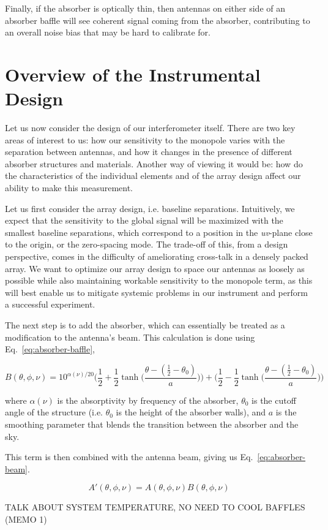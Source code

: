 Finally, if the absorber is optically thin, then antennas on either side of an 
absorber baffle will see coherent signal coming from the absorber, contributing 
to an overall noise bias that may be hard to calibrate for.

\section{Overview of the Instrumental Design}

Let us now consider the design of our interferometer itself. There are two key 
areas of interest to us: how our sensitivity to the monopole varies with the 
separation between antennas, and how it changes in the presence of different 
absorber structures and materials. Another way of viewing it would be: how do 
the characteristics of the individual elements and of the array design affect 
our ability to make this measurement.

Let us first consider the array design, i.e. baseline separations. Intuitively, 
we expect that the sensitivity to the global signal will be maximized with the 
smallest baseline separations, which correspond to a position in the 
\emph{uv}-plane close to the origin, or the zero-spacing mode.  The trade-off 
of this, from a design perspective, comes in the difficulty of ameliorating 
cross-talk in a densely packed array. We want to optimize our array design to 
space our antennas as loosely as possible while also maintaining workable 
sensitivity to the monopole term, as this will best enable us to mitigate 
systemic problems in our instrument and perform a successful experiment.

The next step is to add the absorber, which can essentially be treated as a 
modification to the antenna's beam. This calculation is done using 
Eq.~\eqref{eq:absorber-baffle},

\begin{equation}
    \label{eq:absorber-baffle}
    B(\theta, \phi, \nu) = 10^{\alpha(\nu)/20} \Big(\frac{1}{2} + \frac{1}{2} 
    \tanh\Big(\frac{\theta - (\frac{1}{2} - \theta_{0})}{a}\Big)\Big) +
    \Big(\frac{1}{2} - \frac{1}{2} \tanh\Big(\frac{\theta - (\frac{1}{2} - 
    \theta_{0})}{a}\Big)\Big)
\end{equation}

where $\alpha(\nu)$ is the absorptivity by frequency of the absorber, 
$\theta_0$ is the cutoff angle of the structure (i.e. $\theta_0$ is the height 
of the absorber walls), and $a$ is the smoothing parameter that blends the 
transition between the absorber and the sky.

This term is then combined with the antenna beam, giving us 
Eq.~\eqref{eq:absorber-beam}.

\begin{equation}
    \label{eq:absorber-beam}
    A'(\theta, \phi, \nu) = A(\theta, \phi, \nu) B(\theta, \phi, \nu)
\end{equation}

TALK ABOUT SYSTEM TEMPERATURE, NO NEED TO COOL BAFFLES (MEMO 1)
